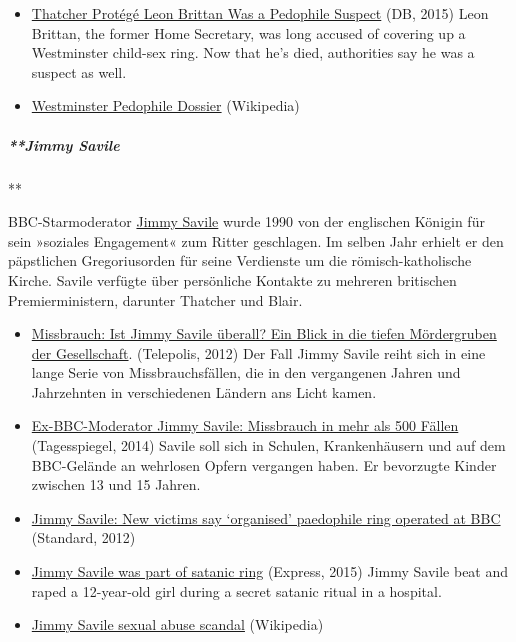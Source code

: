 \begin{itemize}
{  on VIP Westminster paedophile sex ring names leading MPs} (IBTI, 2014)
  High-profile figures linked to sexual abuse includes Tory and Labour
  MPs and peers.
\item
  \href{https://www.thedailybeast.com/thatcher-protege-leon-brittan-was-a-pedophile-suspect}{Thatcher
  Protégé Leon Brittan Was a Pedophile Suspect} (DB, 2015) Leon Brittan,
  the former Home Secretary, was long accused of covering up a
  Westminster child-sex ring. Now that he's died, authorities say he was
  a suspect as well.
\item
  \href{https://en.wikipedia.org/wiki/Westminster_paedophile_dossier}{Westminster
  Pedophile Dossier} (Wikipedia)
\end{itemize}

\hypertarget{jimmy-savile}{%
\subparagraph{**Jimmy Savile}\label{jimmy-savile}}

**

BBC-Starmoderator
\href{https://de.wikipedia.org/wiki/Jimmy_Savile}{Jimmy Savile} wurde
1990 von der englischen Königin für sein »soziales Engagement« zum
Ritter geschlagen. Im selben Jahr erhielt er den päpstlichen
Gregoriusorden für seine Verdienste um die römisch-katholische Kirche.
Savile verfügte über persönliche Kontakte zu mehreren britischen
Premierministern, darunter Thatcher und Blair.

\begin{itemize}
\tightlist
\item
  \href{https://www.heise.de/tp/features/Missbrauch-Ist-Jimmy-Savile-ueberall-3396511.html}{Missbrauch:
  Ist Jimmy Savile überall? Ein Blick in die tiefen Mördergruben der
  Gesellschaft}. (Telepolis, 2012) Der Fall Jimmy Savile reiht sich in
  eine lange Serie von Missbrauchsfällen, die in den vergangenen Jahren
  und Jahrzehnten in verschiedenen Ländern ans Licht kamen.
\item
  \href{https://www.tagesspiegel.de/weltspiegel/kindesmissbrauch-ex-bbc-moderator-jimmy-savile-missbrauch-in-mehr-als-500-faellen/9977734.html}{Ex-BBC-Moderator
  Jimmy Savile: Missbrauch in mehr als 500 Fällen} (Tagesspiegel, 2014)
  Savile soll sich in Schulen, Krankenhäusern und auf dem BBC-Gelände an
  wehrlosen Opfern vergangen haben. Er bevorzugte Kinder zwischen 13 und
  15 Jahren.
\item
  \href{https://www.standard.co.uk/news/crime/jimmy-savile-new-victims-say-organised-paedophile-ring-operated-at-bbc-8224562.html}{Jimmy
  Savile: New victims say `organised' paedophile ring operated at BBC}
  (Standard, 2012)
\item
  \href{https://www.express.co.uk/news/uk/370439/Jimmy-Savile-was-part-of-satanic-ring}{Jimmy
  Savile was part of satanic ring} (Express, 2015) Jimmy Savile beat and
  raped a 12-year-old girl during a secret satanic ritual in a hospital.
\item
  \href{https://en.wikipedia.org/wiki/Jimmy_Savile_sexual_abuse_scandal}{Jimmy
  Savile sexual abuse scandal} (Wikipedia)
\end{itemize}

